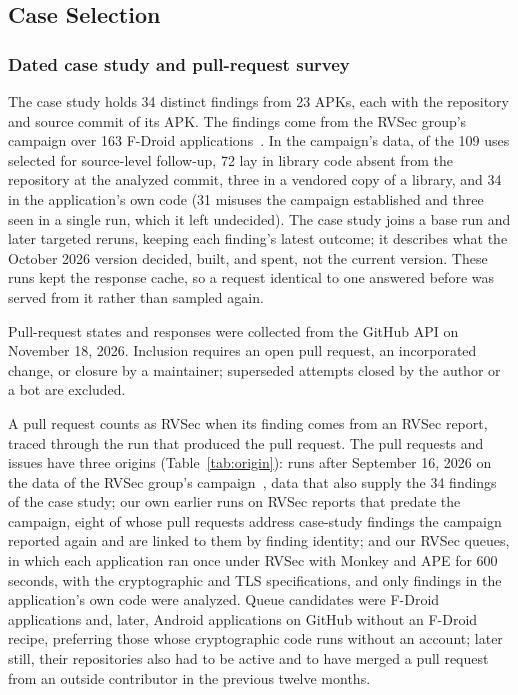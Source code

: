 \documentclass[conference]{IEEEtran}
\begin{document}
\subsection{Case Selection}
\label{subsec:selection}

\subsubsection{Dated case study and pull-request survey}

The case study holds 34 distinct findings from 23 APKs, each with the
repository and source commit of its APK. The findings come from the RVSec
group's campaign over 163 F-Droid applications~\cite{costa2026effectiveness}.
In the campaign's data, of the 109 uses selected for source-level follow-up,
72 lay in library code absent from the repository at the analyzed commit,
three in a vendored copy of a library, and 34 in the application's own code
(31 misuses the campaign established and three seen in a single run, which it
left undecided). The case study joins a base run and later targeted reruns,
keeping each finding's latest outcome; it describes what the October 2026
version decided, built, and spent, not the current version. These runs kept
the response cache, so a request identical to one answered before was served
from it rather than sampled again.

Pull-request states and responses were collected from the GitHub API on
November 18, 2026. Inclusion requires an open pull request, an incorporated change, or closure
by a maintainer; superseded attempts closed by the author or a bot are
excluded.

A pull request counts as RVSec when its finding comes from an RVSec report,
traced through the run that produced the pull request. The pull requests and
issues have three origins (Table~\ref{tab:origin}): runs after September 16,
2026 on the data of the RVSec group's campaign~\cite{costa2026effectiveness},
data that also supply the 34 findings of the case study; our own earlier runs
on RVSec reports that predate the campaign, eight of whose pull requests
address case-study findings the campaign reported again and are linked to them
by finding identity; and our RVSec queues, in which each application ran once
under RVSec with Monkey and APE for 600 seconds, with the cryptographic and TLS
specifications, and only findings in the application's own code were analyzed. Queue candidates were F-Droid
applications and, later, Android applications on GitHub without an F-Droid
recipe, preferring those whose cryptographic code runs without an account;
later still, their repositories also had to be active and to have merged a
pull request from an outside contributor in the previous twelve months.
\end{document}
